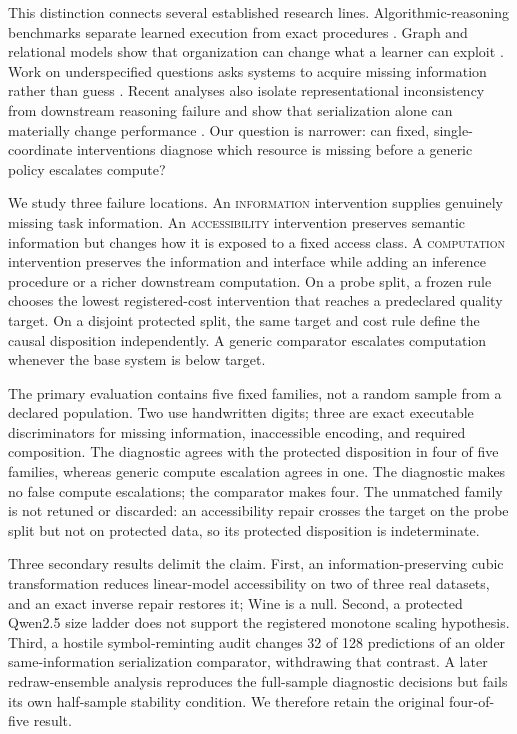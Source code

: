 \documentclass[10pt]{article}
\newcommand{\Info}{\textsc{information}}
\newcommand{\Access}{\textsc{accessibility}}
\newcommand{\Compute}{\textsc{computation}}
\begin{document}
This distinction connects several established research lines. Algorithmic-reasoning benchmarks separate learned execution from exact procedures \citep{velickovic2022clrs,bounsi2024transnar}. Graph and relational models show that organization can change what a learner can exploit \citep{ying2021graphormer,rampasek2022gps}. Work on underspecified questions asks systems to acquire missing information rather than guess \citep{li2025questbench}. Recent analyses also isolate representational inconsistency from downstream reasoning failure and show that serialization alone can materially change performance \citep{liem2026temporal,lo2026serialization}. Our question is narrower: can fixed, single-coordinate interventions diagnose which resource is missing before a generic policy escalates compute?

We study three failure locations. An \Info{} intervention supplies genuinely missing task information. An \Access{} intervention preserves semantic information but changes how it is exposed to a fixed access class. A \Compute{} intervention preserves the information and interface while adding an inference procedure or a richer downstream computation. On a probe split, a frozen rule chooses the lowest registered-cost intervention that reaches a predeclared quality target. On a disjoint protected split, the same target and cost rule define the causal disposition independently. A generic comparator escalates computation whenever the base system is below target.

The primary evaluation contains five fixed families, not a random sample from a declared population. Two use handwritten digits; three are exact executable discriminators for missing information, inaccessible encoding, and required composition. The diagnostic agrees with the protected disposition in four of five families, whereas generic compute escalation agrees in one. The diagnostic makes no false compute escalations; the comparator makes four. The unmatched family is not retuned or discarded: an accessibility repair crosses the target on the probe split but not on protected data, so its protected disposition is indeterminate.

Three secondary results delimit the claim. First, an information-preserving cubic transformation reduces linear-model accessibility on two of three real datasets, and an exact inverse repair restores it; Wine is a null. Second, a protected Qwen2.5 size ladder does not support the registered monotone scaling hypothesis. Third, a hostile symbol-reminting audit changes 32 of 128 predictions of an older same-information serialization comparator, withdrawing that contrast. A later redraw-ensemble analysis reproduces the full-sample diagnostic decisions but fails its own half-sample stability condition. We therefore retain the original four-of-five result.
\end{document}
